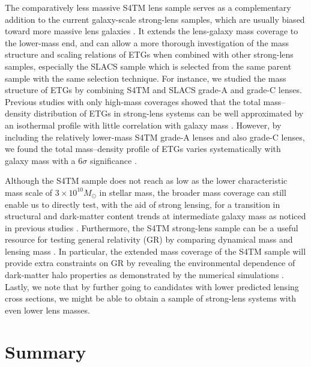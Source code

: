 \documentclass{emulateapj}
\begin{document}
The comparatively less massive S4TM lens sample serves as a complementary addition to 
the current galaxy-scale strong-lens samples, which are usually biased toward 
more massive lens galaxies \citep[e.g.,][]{SLACSX, Faure11, Brownstein12, Sonnenfeld13}. 
It extends the lens-galaxy mass coverage to the lower-mass end, and can allow a more 
thorough investigation of the mass structure and scaling relations of ETGs 
when combined with other strong-lens samples, especially the SLACS sample 
which is selected from the same parent sample with the same selection technique. 
For instance, we studied the mass structure of ETGs by combining S4TM and SLACS 
grade-A and grade-C lenses. Previous studies with only high-mass coverages showed that 
the total mass--density distribution of ETGs in strong-lens systems can be well approximated 
by an isothermal profile with little correlation with galaxy mass 
\citep[e.g.,][]{SLACSIII, SLACSVII, Koopmans09, Barnabe11, Ruff11}. 
However, by including the relatively lower-mass S4TM grade-A lenses and also grade-C lenses, 
we found the total mass--density profile of ETGs varies systematically with galaxy mass 
with a 6$\sigma$ significance \citep{Shu15}. 

Although the S4TM sample does not reach as 
low as the lower characteristic mass scale of $3 \times10^{10} M_{\odot}$ in stellar mass, 
the broader mass coverage can still enable us to directly test, with the aid of 
strong lensing, for a transition in structural and dark-matter content trends at  
intermediate galaxy mass as noticed in previous studies 
\citep[e.g.,][]{Tremblay96, Graham03a, vanderWel09, Bernardi11a, Bernardi11b, 
Cappellari13a, Cappellari13}. Furthermore, the S4TM strong-lens sample can be a 
useful resource for testing general relativity (GR) by comparing dynamical mass and 
lensing mass \citep[e.g.,][]{Bolton06c, Jain08, Schwab10, Cao17}. In particular, 
the extended mass coverage of the S4TM sample will provide extra constraints 
on GR by revealing the environmental dependence of dark-matter halo properties as 
demonstrated by the numerical simulations \citep[e.g.,][]{Zhao11, Winther12, He14}. 
Lastly, we note that by further going to candidates with lower predicted lensing 
cross sections, we might be able to obtain a sample of strong-lens systems with 
even lower lens masses. 

\section{Summary}
\label{sect:summary}
\end{document}
